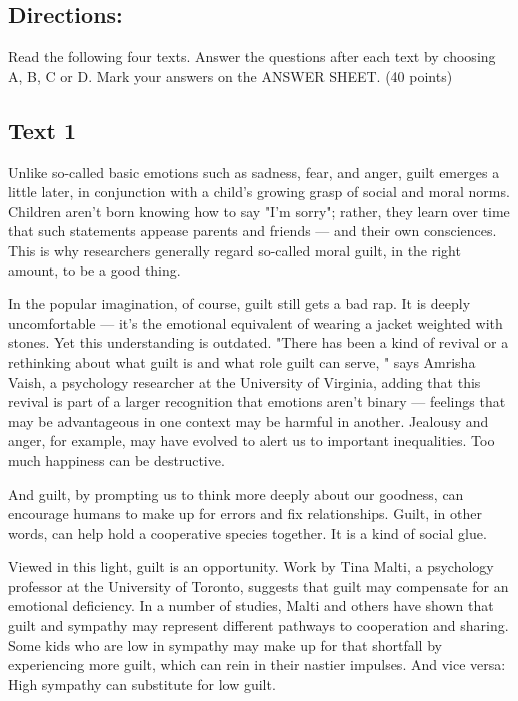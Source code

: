 \documentclass[UTF8,11pt]{ctexart}
\begin{document}
\subsection*{\textbf{Directions:}}


Read the following four texts. Answer the questions after each text by choosing A, B, C or D. Mark your answers on the ANSWER SHEET. (40 points)


\subsection*{\textbf{Text 1}}


Unlike so-called basic emotions such as sadness, fear, and anger, guilt emerges a little later, in conjunction with a child's growing grasp of social and moral norms. Children aren't born knowing how to say "I'm sorry"; rather, they learn over time that such statements appease parents and friends — and their own consciences. This is why researchers generally regard so-called moral guilt, in the right amount, to be a good thing.


In the popular imagination, of course, guilt still gets a bad rap. It is deeply uncomfortable — it's the emotional equivalent of wearing a jacket weighted with stones. Yet this understanding is outdated. "There has been a kind of revival or a rethinking about what guilt is and what role guilt can serve, " says Amrisha Vaish, a psychology researcher at the University of Virginia, adding that this revival is part of a larger recognition that emotions aren't binary — feelings that may be advantageous in one context may be harmful in another. Jealousy and anger, for example, may have evolved to alert us to important inequalities. Too much happiness can be destructive.


And guilt, by prompting us to think more deeply about our goodness, can encourage humans to make up for errors and fix relationships. Guilt, in other words, can help hold a cooperative species together. It is a kind of social glue.


Viewed in this light, guilt is an opportunity. Work by Tina Malti, a psychology professor at the University of Toronto, suggests that guilt may compensate for an emotional deficiency. In a number of studies, Malti and others have shown that guilt and sympathy may represent different pathways to cooperation and sharing. Some kids who are low in sympathy may make up for that shortfall by experiencing more guilt, which can rein in their nastier impulses. And vice versa: High sympathy can substitute for low guilt.
\end{document}

